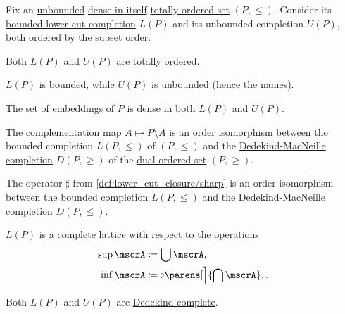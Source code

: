 \begin{theorem}\label{thm:unbounded_lower_cut_completion}
  Fix an \hyperref[def:extremal_points/bounds]{unbounded} \hyperref[def:dense_total_order]{dense-in-itself} \hyperref[def:totally_ordered_set]{totally ordered set} \( (P, \leq) \). Consider its \hyperref[def:lower_cut_completion]{bounded lower cut completion} \( L(P) \) and its unbounded completion \( U(P) \), both ordered by the subset order.

  \begin{thmenum}
     Both \( L(P) \) and \( U(P) \) are totally ordered.

     \( L(P) \) is bounded, while \( U(P) \) is unbounded (hence the names).

     The set of embeddings of \( P \) is dense in both \( L(P) \) and \( U(P) \).

     The complementation map \( A \mapsto P \setminus A \) is an \hyperref[def:preordered_set/homomorphism]{order isomorphism} between the bounded completion \( L(P, \leq) \) of \( (P, \leq) \) and the \hyperref[def:dedekind_macnielle_completion]{Dedekind-MacNeille completion} \( D(P, \geq) \) of the \hyperref[def:preordered_set/opposite]{dual ordered set} \( (P, \geq) \).

     The operator \( \sharp \) from \cref{def:lower_cut_closure/sharp} is an order isomorphism between the bounded completion \( L(P, \leq) \) and the Dedekind-MacNeille completion \( D(P, \leq) \).

     \( L(P) \) is a \hyperref[def:complete_lattice]{complete lattice} with respect to the operations
    \begin{align}
      \sup \mscrA &\coloneqq \bigcup \mscrA,                       \label{eq:thm:unbounded_lower_cut_completion/lattice/join} \\
      \inf \mscrA &\coloneqq \flat\parens[\Big]{ \bigcap \mscrA }, \label{eq:thm:unbounded_lower_cut_completion/lattice/meet}.
    \end{align}

     Both \( L(P) \) and \( U(P) \) are \hyperref[def:dedekind_completeness]{Dedekind complete}.
  \end{thmenum}
\end{theorem}
